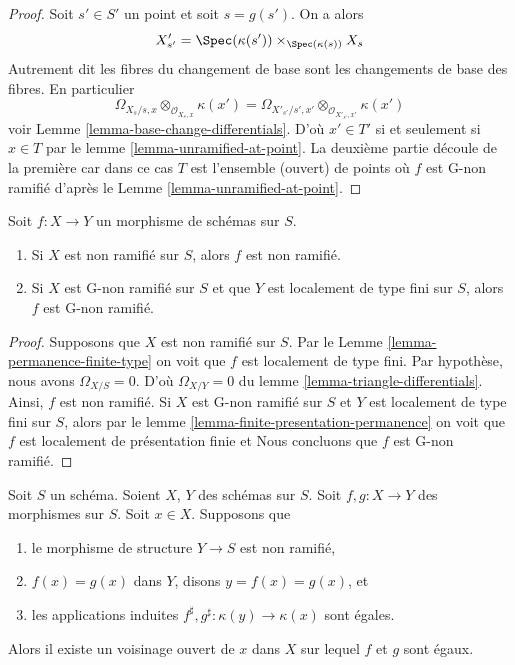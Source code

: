 \begin{proof}
Soit $s' \in S'$ un point et soit $s = g(s')$. On a alors
$$
X'_{s'} =
\Spec(\kappa(s')) \times_{\Spec(\kappa(s))} X_s
$$
Autrement dit les fibres du changement de base sont les changements de base
des fibres. En particulier
$$
\Omega_{X_s/s, x} \otimes_{\mathcal{O}_{X_s, x}} \kappa(x')
=
\Omega_{X'_{s'}/s', x'} \otimes_{\mathcal{O}_{X'_{s'}, x'}} \kappa(x')
$$
voir
Lemme \ref{lemma-base-change-differentials}. D'où $x' \in T'$ si
et seulement si $x \in T$ par le lemme
\ref{lemma-unramified-at-point}. La deuxième partie
découle de la première car dans ce cas $T$
est l'ensemble (ouvert) de points où $f$ est G-non
ramifié d'après le Lemme \ref{lemma-unramified-at-point}.
\end{proof}

\begin{lemma}
\label{lemma-unramified-permanence}
Soit $f : X \to Y$ un morphisme de schémas sur $S$.
\begin{enumerate}
\item Si $X$ est non ramifié sur $S$, alors $f$ est non ramifié.
\item Si $X$ est G-non ramifié sur $S$ et que $Y$ est localement de type fini sur
$S$, alors $f$ est G-non ramifié.
\end{enumerate}
\end{lemma}

\begin{proof}
Supposons que $X$ est non ramifié
sur $S$. Par le Lemme \ref{lemma-permanence-finite-type} on voit que $f$
est localement de type fini.
Par hypothèse, nous avons $\Omega_{X/S} = 0$. D'où $\Omega_{X/Y} = 0$
du lemme \ref{lemma-triangle-differentials}. Ainsi, $f$ est non ramifié. Si
$X$ est G-non ramifié sur $S$ et $Y$ est localement
de type fini sur $S$, alors
par le lemme \ref{lemma-finite-presentation-permanence} on voit que $f$
est localement de présentation finie et Nous concluons que $f$
est G-non ramifié.
\end{proof}

\begin{lemma}
\label{lemma-value-at-one-point}
Soit $S$ un schéma.
Soient $X$, $Y$ des schémas sur
$S$. Soit $f, g : X \to Y$ des morphismes sur $S$. Soit $x \in X$.
Supposons que
\begin{enumerate}
\item le morphisme de structure $Y \to S$ est non ramifié,
\item $f(x) = g(x)$ dans $Y$, disons $y = f(x) = g(x)$, et
\item les applications induites $f^\sharp, g^\sharp : \kappa(y) \to \kappa(x)$ sont
égales.
\end{enumerate}
Alors il existe un voisinage ouvert de $x$ dans $X$ sur lequel $f$
et $g$ sont égaux.
\end{lemma}

